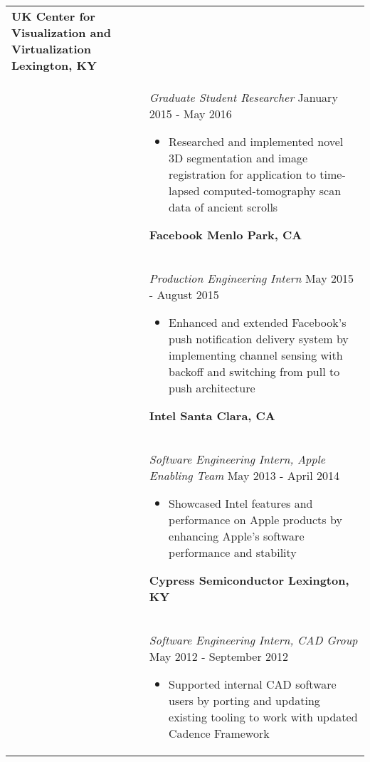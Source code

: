 \documentclass[11pt]{article}
\begin{document}
\begin{tabular}{p{0.75in} p{5.45in}}
        \textbf{UK Center for Visualization and Virtualization \hfill Lexington, KY} \vspace{0.015in} \\ &
        {\textit{Graduate Student Researcher} \hfill January 2015 - May 2016} \vspace{0.02in}
        \begin{itemize}
            \renewcommand{\labelitemi}{$\diamond$}
            \item Researched and implemented novel 3D segmentation and image registration for application to time-lapsed computed-tomography scan data of ancient scrolls
        \end{itemize} \vspace{0.09in}

        \textbf{Facebook \hfill Menlo Park, CA} \vspace{0.015in} \\ &
        {\textit{Production Engineering Intern} \hfill May 2015 - August 2015} \vspace{0.02in}
        \begin{itemize}
            \renewcommand{\labelitemi}{$\diamond$}
            \item Enhanced and extended Facebook's push notification delivery system by implementing channel sensing with backoff and switching from pull to push architecture
        \end{itemize} \vspace{0.09in}

        \textbf{Intel \hfill Santa Clara, CA} \vspace{0.015in} \\ &
        {\textit{Software Engineering Intern, Apple Enabling Team} \hfill May 2013 - April 2014} \vspace{0.02in}
        \begin{itemize}
            \renewcommand{\labelitemi}{$\diamond$}
            \item Showcased Intel features and performance on Apple products by enhancing Apple's software performance and stability
        \end{itemize} \vspace{0.09in}

        \textbf{Cypress Semiconductor \hfill Lexington, KY} \vspace{0.015in} \\ &
        {\textit{Software Engineering Intern, CAD Group} \hfill May 2012 - September 2012} \vspace{0.02in}
        \begin{itemize}
            \renewcommand{\labelitemi}{$\diamond$}
            \item Supported internal CAD software users by porting and updating existing tooling to work with updated Cadence Framework
        \end{itemize} \vspace{0.09in}


\end{tabular}
\end{document}
